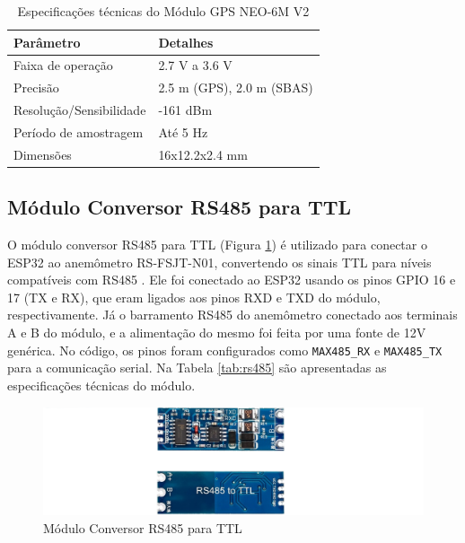 \begin{table}[!htb]
  \caption{Especificações técnicas do Módulo GPS NEO-6M V2}
  \begin{tabularx}{\textwidth}{|X|X|} \hline
      \textbf{Parâmetro} & \textbf{Detalhes} \\ \hline
      Faixa de operação & 2.7 V a 3.6 V \\ \hline
      Precisão & 2.5 m (GPS), 2.0 m (SBAS) \\ \hline
      Resolução/Sensibilidade & -161 dBm \\ \hline
      Período de amostragem & Até 5 Hz \\ \hline
      Dimensões & 16x12.2x2.4 mm \\ \hline
  \end{tabularx}
  \label{tab:neo6}
\end{table}

\subsection{Módulo Conversor RS485 para TTL}

O módulo conversor RS485 para TTL (Figura \ref{figura:ttl_rs485}) é utilizado para conectar o ESP32 ao anemômetro RS-FSJT-N01, convertendo os sinais TTL para níveis compatíveis com RS485 \parencite{RS485TTL}. Ele foi conectado ao ESP32 usando os pinos GPIO 16 e 17 (TX e RX), que eram ligados aos pinos RXD e TXD do módulo, respectivamente. Já o barramento RS485 do anemômetro conectado aos terminais A e B do módulo, e a alimentação do mesmo foi feita por uma fonte de 12V genérica. No código, os pinos foram configurados como \texttt{MAX485\_RX} e \texttt{MAX485\_TX} para a comunicação serial. Na Tabela \ref{tab:rs485} são apresentadas as especificações técnicas do módulo.

\begin{figure}[!htb] \centering
  \caption{Módulo Conversor RS485 para TTL} \label{figura:ttl_rs485}
  \begin{varwidth}{\linewidth}
    \includegraphics[width=16cm]{figuras/TTL_TO_RS485.png}
  \end{varwidth}
\end{figure}

